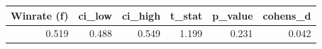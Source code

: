 \begin{tabular}{rrrrrr}
\toprule
Winrate (f) & ci\_low & ci\_high & t\_stat & p\_value & cohens\_d \\
\midrule
0.519 & 0.488 & 0.549 & 1.199 & 0.231 & 0.042 \\
\bottomrule
\end{tabular}
